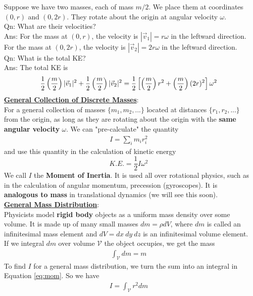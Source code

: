 \documentclass{article}
\begin{document}
Suppose we have two masses, each of mass $m/2$. We place them at coordinates $(0,r)$ and $(0,2r)$. They rotate about the origin at angular velocity $\omega$.\\[10pt]
Qn: What are their velocities? \\[0pt]
Ans: For the mass at $(0,r)$, the velocity is $|\vec{v}_1| = r\omega$ in the leftward direction. For the mass at $(0,2r)$, the velocity is $|\vec{v}_2| = 2r\omega$ in the leftward direction. \\[10pt]
Qn: What is the total KE? \\[0pt]
Ans: The total KE is 
\begin{align}
\frac{1}{2} \left(\frac{m}{2}\right) |\vec{v}_1|^2 + \frac{1}{2} \left(\frac{m}{2}\right) |\vec{v}_2|^2 = \frac{1}{2} \left[ \left(\frac{m}{2} \right) r^2 + \left( \frac{m}{2}\right) (2r)^2 \right] \omega^2 \notag 
\end{align}
\underline{\textbf{General Collection of Discrete Masses}}: \\[2pt] For a general collection of masses $\{m_1,m_2,...\}$ located at distances $\{r_1, r_2, ...\}$ from the origin, as long as they are rotating about the origin with the \textbf{same angular velocity} $\omega$. We can "pre-calculate" the quantity 
\begin{align}
I = \sum_i m_i r_i^2  \label{eq:mom}    
\end{align}
and use this quantity in the calculation of kinetic energy $$K.E. = \frac{1}{2} I \omega^2 $$
We call $I$ the \textbf{Moment of Inertia}. It is used all over rotational physics, such as in the calculation of angular momentum, precession (gyroscopes). It is \textbf{analogous to mass} in translational dynamics (we will see this soon).\\[10pt]
\underline{\textbf{General Mass Distribution}}: \\[2pt] Physicists model \textbf{rigid body} objects as a uniform mass density over some volume. It is made up of many small masses $dm = \rho dV$, where $dm$ is called an infinitesimal mass element and $dV = dx\ dy\ dz$ is an infinitesimal volume element. If we integral $dm$ over volume $\mathcal{V}$ the object occupies, we get the mass
\begin{align}
    \int_{\mathcal V} dm = m
\end{align}
To find $I$ for a general mass distribution, we turn the sum into an integral in Equation \ref{eq:mom}. So we have
\begin{align}
    I = \int_{\mathcal V} r^2 dm 
\end{align}
\end{document}
